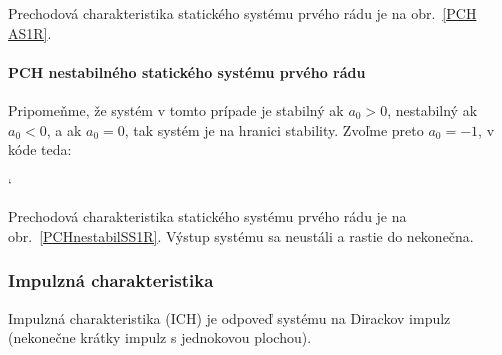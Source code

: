 \documentclass[a4paper, 10pt, ]{article}
\begin{document}
Prechodová charakteristika statického systému prvého rádu je na obr.~\ref{PCH AS1R}.

\begin{center}


	\label{PCH AS1R}

\end{center}





\paragraph{PCH nestabilného statického systému prvého rádu}

Pripomeňme, že  systém v tomto prípade je stabilný ak $a_0 > 0$, nestabilný ak $a_0 < 0$, a ak $a_0 = 0$, tak systém je na hranici stability. Zvoľme preto $a_0 = -1$, v kóde teda:
{\catcode`

}
\noindent
Prechodová charakteristika statického systému prvého rádu je na obr.~\ref{PCHnestabilSS1R}. Výstup systému sa neustáli a rastie do nekonečna.

\begin{center}


	\label{PCHnestabilSS1R}

\end{center}














\subsubsection{Impulzná charakteristika}

Impulzná charakteristika (ICH) je odpoveď systému na Dirackov impulz (nekonečne krátky impulz s jednokovou plochou).
\end{document}

